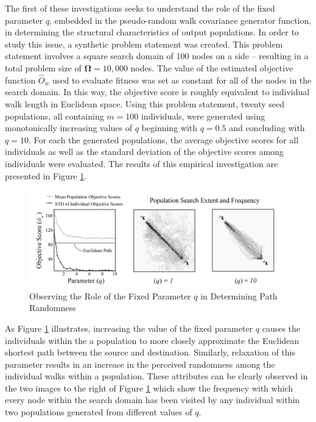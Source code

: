 The first of these investigations seeks to understand the role of the fixed parameter $q$, embedded in the pseudo-random walk covariance generator function, in determining the structural characteristics of output populations. In order to study this issue, a synthetic problem statement was created. This problem statement involves a square search domain of 100 nodes on a side – resulting in a total problem size of $\boldsymbol\Omega = 10,000$ nodes. The value of the estimated objective function $\hat{O}_w$ used to evaluate fitness was set as constant for all of the nodes in the search domain. In this way, the objective score is roughly equivalent to individual walk length in Euclidean space. Using this problem statement, twenty seed populations, all containing $m = 100$ individuals, were generated  using monotonically increasing values of $q$ beginning with $q = 0.5$ and concluding with $q = 10$. For each the generated populations, the average objective scores for all individuals as well as the standard deviation of the objective scores among individuals were evaluated. The results of this empirical investigation are presented in Figure \ref{fig:path-randomness}.
            
            \begin{figure}[!h]
            \centering
            \includegraphics[width=5.5in]{figures/path-randomness-study.png}
            \caption[Observing the Role of the Fixed Parameter $q$ in Determining Individual Path Randomness]{Observing the Role of the Fixed Parameter $q$ in Determining Path Randomness}
            \label{fig:path-randomness}
            \end{figure}
            
As Figure \ref{fig:path-randomness} illustrates, increasing the value of the fixed parameter $q$ causes the individuals within the a population to more closely approximate the Euclidean shortest path between the source and destination. Similarly, relaxation of this parameter results in an increase in the perceived randomness among the individual walks within a population. These attributes can be clearly observed in the two images to the right of Figure \ref{fig:path-randomness} which show the frequency with which every node within the search domain has been visited by any individual within two populations generated from different values of $q$.
            

